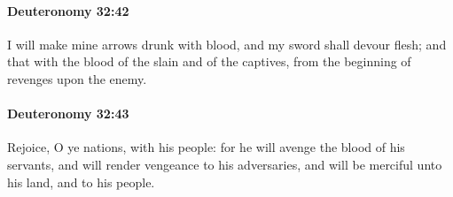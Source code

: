 		\paragraph{Deuteronomy 32:42} %
			\label{DEUTERONOMY-32-42}

			I will make mine arrows drunk with blood, and my sword shall devour flesh; and that with the blood of the slain and of the captives, from the beginning of revenges upon the enemy.


		\paragraph{Deuteronomy 32:43} %
			\label{DEUTERONOMY-32-43}

			Rejoice, O ye nations, with his people: for he will avenge the blood of his servants, and will render vengeance to his adversaries, and will be merciful unto his land, and to his people.

